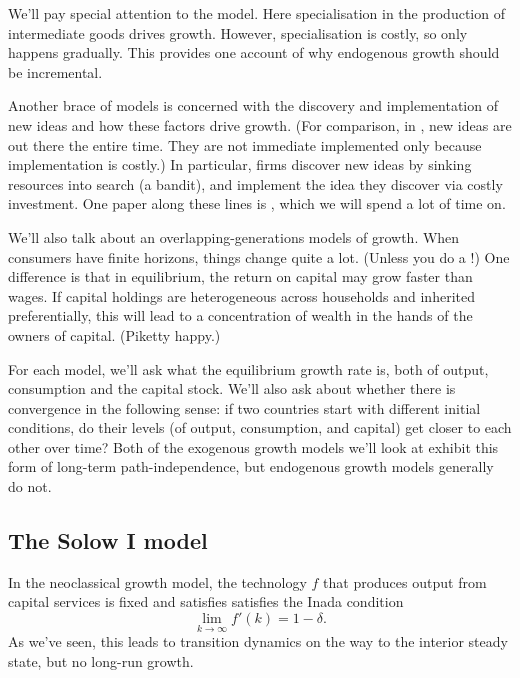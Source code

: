 \documentclass[11pt,letterpaper,reqno,oneside]{article}
\begin{document}
We'll pay special attention to the \textcite{Romer1987} model. Here specialisation in the production of intermediate goods drives growth. However, specialisation is costly, so only happens gradually. This provides one account of why endogenous growth should be incremental.

Another brace of models is concerned with the discovery and implementation of new ideas and how these factors drive growth. (For comparison, in \textcite{Romer1987}, new ideas are out there the entire time. They are not immediate implemented only because implementation is costly.) In particular, firms discover new ideas by sinking resources into search (a bandit), and implement the idea they discover via costly investment. One paper along these lines is \textcite{CominGertler2006}, which we will spend a lot of time on.

We'll also talk about an overlapping-generations models of growth. When consumers have finite horizons, things change quite a lot. (Unless you do a \textcite{Barro1974}!) One difference is that in equilibrium, the return on capital may grow faster than wages. If capital holdings are heterogeneous across households and inherited preferentially, this will lead to a concentration of wealth in the hands of the owners of capital. (Piketty happy.)

For each model, we'll ask what the equilibrium growth rate is, both of output, consumption and the capital stock. We'll also ask about whether there is convergence in the following sense: if two countries start with different initial conditions, do their levels (of output, consumption, and capital) get closer to each other over time? Both of the exogenous growth models we'll look at exhibit this form of long-term path-independence, but endogenous growth models generally do not.



\subsection{The Solow I model}
\label{sec:26Oct2015:solow_I_model}

In the neoclassical growth model, the technology $f$ that produces output from capital services is fixed and satisfies satisfies the Inada condition
%
\begin{equation*}
	\lim_{k \to \infty} f'(k) = 1 - \delta .
\end{equation*}
%
As we've seen, this leads to transition dynamics on the way to the interior steady state, but no long-run growth.
\end{document}
